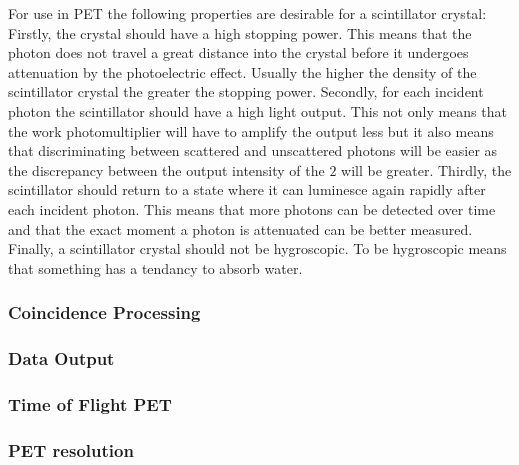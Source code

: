                 For use in \gls{PET} the following properties are desirable for a scintillator crystal: Firstly, the crystal should have a high stopping power. This means that the photon does not travel a great distance into the crystal before it undergoes attenuation by the photoelectric effect. Usually the higher the density of the scintillator crystal the greater the stopping power. Secondly, for each incident photon the scintillator should have a high light output. This not only means that the work photomultiplier will have to amplify the output less but it also means that discriminating between scattered and unscattered photons will be easier as the discrepancy between the output intensity of the $2$ will be greater. Thirdly, the scintillator should return to a state where it can luminesce again rapidly after each incident photon. This means that more photons can be detected over time and that the exact moment a photon is attenuated can be better measured. Finally, a scintillator crystal should not be hygroscopic. To be hygroscopic means that something has a tendancy to absorb water.
            
            \subsubsection{Coincidence Processing} \label{coincidence_processing}
                \blindtext
            
            \subsubsection{Data Output} \label{data_output}
                \blindtext
            
            \subsubsection{Time of Flight PET} \label{tof_pet}
                \blindtext
            
            \subsubsection{PET resolution} \label{pet_resolution}
                \blindtext
            

